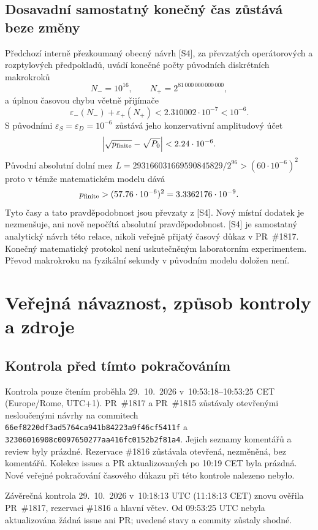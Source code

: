 \documentclass[11pt,a4paper]{article}
\theoremstyle{remark}\newtheorem{remark}[theorem]{Poznámka}
\numberwithin{equation}{section}
\begin{document}
\subsection{Dosavadní samostatný konečný čas zůstává beze změny}

Předchozí interně přezkoumaný obecný návrh [S4], za
převzatých operátorových a rozptylových předpokladů,
uvádí konečné počty původních diskrétních makrokroků
\[
N_-=10^{16},\qquad N_+=2^{81\,000\,000\,000\,000},
\]
a úplnou časovou chybu včetně přijímače
\[
\varepsilon_-(N_-)+\varepsilon_+(N_+)
<2.310002\cdot10^{-7}<10^{-6}.
\]
S původními \(\varepsilon_S=\varepsilon_D=10^{-6}\)
zůstává jeho konzervativní amplitudový účet
\[
\left|\sqrt{p_{\rm finite}}-\sqrt{P_0}\right|
<2.24\cdot10^{-6}.
\]
Původní absolutní dolní mez
\(L=293166031669590845829/2^{96}>(60\cdot10^{-6})^2\)
proto v témže matematickém modelu dává
\[
p_{\rm finite}>(57.76\cdot10^{-6})^2
=3.3362176\cdot10^{-9}.
\]
Tyto časy a tato pravděpodobnost jsou převzaty z [S4].
Nový místní dodatek je nezmenšuje, ani nově nepočítá
absolutní pravděpodobnost. [S4] je samostatný analytický
návrh této relace, nikoli veřejně přijatý časový důkaz
v PR~\#1817. Konečný matematický protokol není
uskutečněným laboratorním experimentem. Převod makrokroku
na fyzikální sekundy v původním modelu doložen není.

\section{Veřejná návaznost, způsob kontroly a zdroje}

\subsection{Kontrola před tímto pokračováním}

Kontrola pouze čtením proběhla 29.~10.~2026
v~10:53:18--10:53:25 CET (Europe/Rome, UTC+1).
PR~\#1817 a PR~\#1815 zůstávaly otevřenými nesloučenými
návrhy na commitech
\nolinkurl{66ef8220df3ad5764ca941b84223a9f46cf5411f} a
\nolinkurl{32306016908c0097650277aa416fc0152b2f81a4}.
Jejich seznamy komentářů a review byly prázdné.
Rezervace \#1816 zůstávala otevřená, nezměněná, bez
komentářů. Kolekce issues a PR aktualizovaných po
10:19 CET byla prázdná. Nové veřejné pokračování
časového důkazu při této kontrole nalezeno nebylo.

Závěrečná kontrola 29.~10.~2026 v~10:18:13 UTC
(11:18:13 CET) znovu ověřila PR~\#1817, rezervaci
\#1816 a hlavní větev. Od 09:53:25 UTC nebyla
aktualizována žádná issue ani PR; uvedené stavy a
commity zůstaly shodné.
\end{document}
